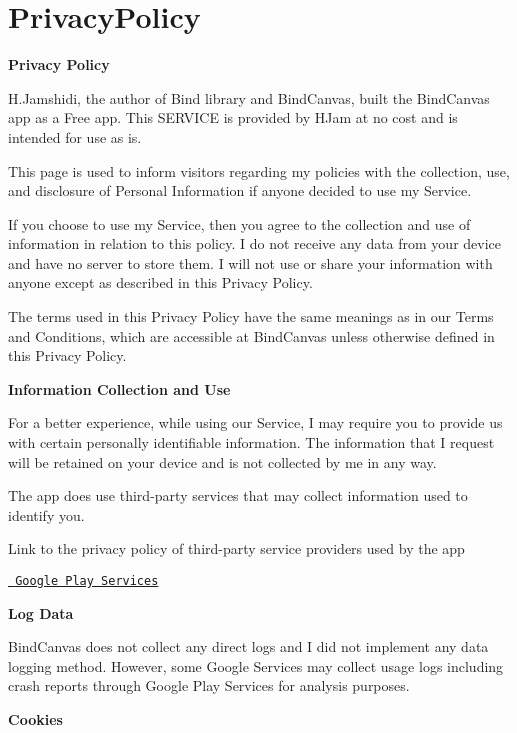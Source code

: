 \chapter{Privacy\+Policy}
\hypertarget{md__privacy_policy}{}\label{md__privacy_policy}
{\bfseries{Privacy Policy}}

H.\+Jamshidi, the author of Bind library and Bind\+Canvas, built the Bind\+Canvas app as a Free app. This SERVICE is provided by HJam at no cost and is intended for use as is.

This page is used to inform visitors regarding my policies with the collection, use, and disclosure of Personal Information if anyone decided to use my Service.

If you choose to use my Service, then you agree to the collection and use of information in relation to this policy. I do not receive any data from your device and have no server to store them. I will not use or share your information with anyone except as described in this Privacy Policy.

The terms used in this Privacy Policy have the same meanings as in our Terms and Conditions, which are accessible at Bind\+Canvas unless otherwise defined in this Privacy Policy.

{\bfseries{Information Collection and Use}}

For a better experience, while using our Service, I may require you to provide us with certain personally identifiable information. The information that I request will be retained on your device and is not collected by me in any way.

The app does use third-\/party services that may collect information used to identify you.

Link to the privacy policy of third-\/party service providers used by the app


\begin{DoxyItemize}
\item \href{https://www.google.com/policies/privacy/}{\texttt{ Google Play Services}}
\end{DoxyItemize}

{\bfseries{Log Data}}

Bind\+Canvas does not collect any direct logs and I did not implement any data logging method. However, some Google Services may collect usage logs including crash reports through Google Play Services for analysis purposes.

{\bfseries{Cookies}}

